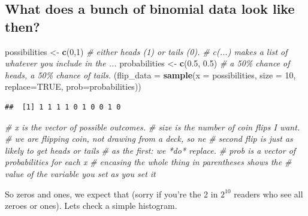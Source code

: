 \documentclass[
]{book}
\newenvironment{Shaded}{\begin{snugshade}}{\end{snugshade}}
\newcommand{\CommentTok}[1]{\textcolor[rgb]{0.56,0.35,0.01}{\textit{#1}}}
\newcommand{\DataTypeTok}[1]{\textcolor[rgb]{0.13,0.29,0.53}{#1}}
\newcommand{\DecValTok}[1]{\textcolor[rgb]{0.00,0.00,0.81}{#1}}
\newcommand{\FloatTok}[1]{\textcolor[rgb]{0.00,0.00,0.81}{#1}}
\newcommand{\KeywordTok}[1]{\textcolor[rgb]{0.13,0.29,0.53}{\textbf{#1}}}
\newcommand{\NormalTok}[1]{#1}
\newcommand{\OtherTok}[1]{\textcolor[rgb]{0.56,0.35,0.01}{#1}}
\newcommand{\StringTok}[1]{\textcolor[rgb]{0.31,0.60,0.02}{#1}}
\begin{document}
\hypertarget{what-does-a-bunch-of-binomial-data-look-like-then}{%
\subsection{What does a bunch of binomial data look like then?}\label{what-does-a-bunch-of-binomial-data-look-like-then}}

\begin{Shaded}
\begin{Highlighting}[]
\NormalTok{possibilities \textless{}{-}}\StringTok{ }\KeywordTok{c}\NormalTok{(}\DecValTok{0}\NormalTok{,}\DecValTok{1}\NormalTok{) }\CommentTok{\# either heads (1) or tails (0).}
                        \CommentTok{\# c(...) makes a list of whatever you include in the ...}
\NormalTok{probabilities \textless{}{-}}\StringTok{ }\KeywordTok{c}\NormalTok{(}\FloatTok{0.5}\NormalTok{, }\FloatTok{0.5}\NormalTok{)}
                        \CommentTok{\# a 50\% chance of heads, a 50\% chance of tails.}
\NormalTok{(}\DataTypeTok{flip\_data =} \KeywordTok{sample}\NormalTok{(}\DataTypeTok{x =}\NormalTok{ possibilities, }\DataTypeTok{size =} \DecValTok{10}\NormalTok{, }\DataTypeTok{replace=}\OtherTok{TRUE}\NormalTok{, }\DataTypeTok{prob=}\NormalTok{probabilities))}
\end{Highlighting}
\end{Shaded}

\begin{verbatim}
##  [1] 1 1 1 1 0 1 0 0 1 0
\end{verbatim}

\begin{Shaded}
\begin{Highlighting}[]
                        \CommentTok{\# x is the vector of possible outcomes.}
                        \CommentTok{\# size is the number of coin flips I want.}
                        \CommentTok{\# we are flipping coin, not drawing from a deck, so ne}
                        \CommentTok{\#   second flip is just as likely to get heads or tails}
                        \CommentTok{\#   as the first: we *do* replace.}
                        \CommentTok{\# prob is a vector of probabilities for each x}
                        \CommentTok{\# encasing the whole thing in parentheses shows the}
                        \CommentTok{\#   value of the variable you set as you set it}
\end{Highlighting}
\end{Shaded}

So zeros and ones, we expect that (sorry if you're the 2 in \(2^{10}\) readers who see all zeroes or ones). Lets check a simple histogram.
\end{document}
